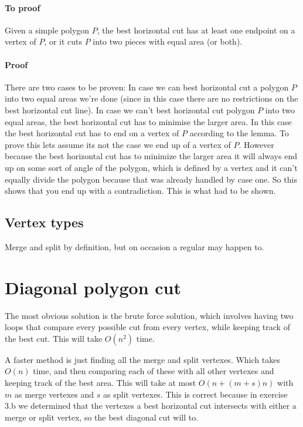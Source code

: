 \documentclass{article}
\begin{document}
\paragraph{To proof} Given a simple polygon $P$, the best horizontal cut
has at least one endpoint on a vertex of $P$, or it cuts $P$ into two pieces
with equal area (or both).

\paragraph{Proof} There are two cases to be proven:
	In case we can best horizontal cut a polygon $P$ into two equal areas
	we're done (since in this case there are no restrictions on the best
	horizontal cut line).
	In case we can't best horizontal cut polygon $P$ into two equal areas,
	the best horizontal cut has to minimise the larger area. In this case
	the best horizontal cut has to end on a vertex of $P$ according to
	the lemma. To prove this lets assume its not the case we end up of a
	vertex of $P$.
	However because the best horizontal cut has to minimize the larger
	area it will always end up on some sort of angle of the polygon, which
	is defined by a vertex and it can't equally divide the polygon because
	that was already handled
	by case one. So this shows that you end up with a contradiction.
	This is what had to be shown.

\subsection{Vertex types}
Merge and split by definition, but on occasion a regular may happen to.
\section{Diagonal polygon cut}
The most obvious solution is the brute force solution, which involves
having two loops that compare every possible cut from every vertex,
while keeping track of the best cut. This will take $O(n^2)$ time.

A faster method is just finding all the merge and split vertexes. Which takes
$O(n)$ time, and then comparing each of these with all other vertexes and keeping
track of the best area. This will take at most $O(n+(m+s)n)$
with $m$ as merge vertexes and $s$ as split vertexes. This is correct because in
exercise 3.b we determined that the vertexes a best horizontal cut intersects
with either a merge or split vertex, so the best diagonal cut will to.
\end{document}
